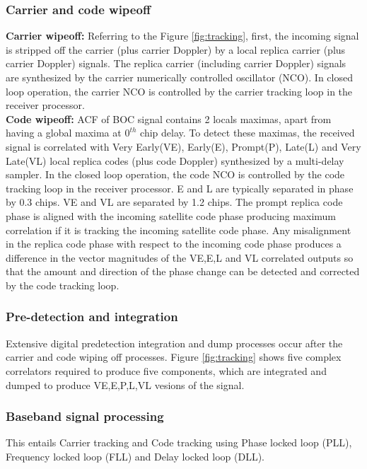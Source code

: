 \documentclass[conference]{IEEEtran}
\begin{document}
\subsubsection{Carrier and code wipeoff}
\textbf{Carrier wipeoff: }Referring to the Figure \ref{fig:tracking}, first, the incoming signal is 
stripped off the carrier (plus carrier Doppler) by a local replica carrier (plus carrier Doppler) 
signals. The replica carrier (including carrier Doppler) signals are synthesized by the carrier 
numerically controlled oscillator (NCO). In closed loop operation, the carrier NCO is controlled 
by the carrier tracking loop in the receiver processor.
\\
\textbf{Code wipeoff: }ACF of BOC signal contains 2 locals maximas, apart from having a global maxima at $0^{th}$ chip delay.
To detect these maximas, the received signal is  correlated with Very Early(VE), Early(E), 
Prompt(P), Late(L) and Very Late(VL) local replica codes (plus code Doppler) synthesized by a 
multi-delay sampler. In the closed loop operation, the code NCO is controlled by the code tracking 
loop in the receiver processor. E and L are typically separated in phase by 0.3 chips. VE and VL are
separated by 1.2 chips. The prompt replica code phase is aligned with the 
incoming satellite code phase producing maximum correlation if it is tracking the incoming satellite code 
phase.  Any misalignment in the replica code phase with respect to the incoming code phase produces 
a difference in the vector magnitudes of the VE,E,L and VL correlated outputs so that the amount 
and direction of the phase change can be detected and corrected by the code tracking loop.
\subsubsection{Pre-detection and integration}
Extensive digital predetection integration and dump processes occur after the carrier and code 
wiping off processes. Figure \ref{fig:tracking} shows five complex correlators required to produce 
five components, which are integrated and dumped to produce VE,E,P,L,VL vesions of the signal.
\subsubsection{Baseband signal processing}
This entails Carrier tracking and Code tracking using Phase locked loop (PLL), Frequency locked loop
(FLL) and Delay locked loop (DLL). \\
\end{document}
